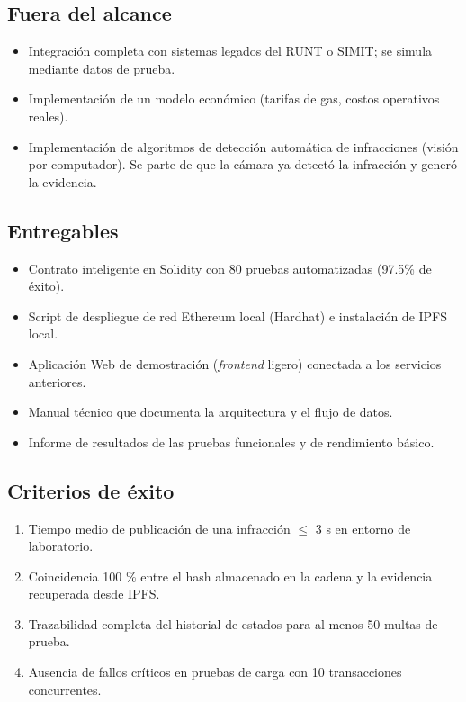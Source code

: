 \subsection{Fuera del alcance}
\begin{itemize}
  \item Integración completa con sistemas legados del RUNT o SIMIT; se simula mediante datos de prueba.
  \item Implementación de un modelo económico (tarifas de gas, costos operativos reales).
  \item Implementación de algoritmos de detección automática de infracciones (visión por computador).  
        Se parte de que la cámara ya detectó la infracción y generó la evidencia.
\end{itemize}

\subsection{Entregables}
\begin{itemize}
  \item Contrato inteligente en Solidity con 80 pruebas automatizadas (97.5\% de éxito).
  \item Script de despliegue de red Ethereum local (Hardhat) e instalación de IPFS local.
  \item Aplicación Web de demostración (\emph{frontend} ligero) conectada a los servicios anteriores.
  \item Manual técnico que documenta la arquitectura y el flujo de datos.
  \item Informe de resultados de las pruebas funcionales y de rendimiento básico.
\end{itemize}

\subsection{Criterios de éxito}
\begin{enumerate}
  \item Tiempo medio de publicación de una infracción $\leq$ 3 s en entorno de laboratorio.
  \item Coincidencia 100 \% entre el hash almacenado en la cadena y la evidencia recuperada desde IPFS.
  \item Trazabilidad completa del historial de estados para al menos 50 multas de prueba.
  \item Ausencia de fallos críticos en pruebas de carga con 10 transacciones concurrentes.
\end{enumerate}


